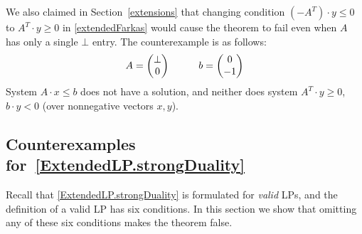 \documentclass[]{article}
\renewcommand{\.}{\hskip .75pt}
\newcommand{\sekt}[1]{Section~\ref{#1}}
\let\*=\cdot
\begin{document}
We also claimed in \sekt{extensions} that changing condition $(-A^T) \* y \le 0$
to  $A^T \* y \ge 0$ in  \ref{extendedFarkas} would cause the theorem
to fail even when $A$ has only a single $\bot$ entry. The counterexample is as follows:
$$
\begin{array}{c@{\hspace{30pt}}c}
A =
\begin{pmatrix}
	\bot  \\
	0 
\end{pmatrix}
&
b = \begin{pmatrix} 0 \\ -1 \end{pmatrix}
\end{array}
$$
System $A \* x\le b$ does not have a solution, and neither does system
$A^T \* y \ge 0$, $b \* y < 0$ (over nonnegative vectors $x,y$).

\subsection{Counterexamples for~\ref{ExtendedLP.strongDuality}}\label{sec:ExtendedLP.strongDuality:counterexamples}
Recall that \ref{ExtendedLP.strongDuality} is formulated for {\em valid} LPs,
and the definition of a valid LP has six conditions.
In this section we show that omitting any of these six conditions
makes the theorem false.
\end{document}
